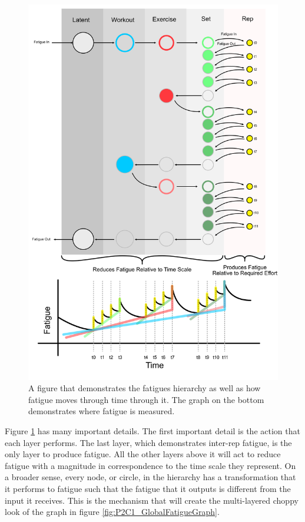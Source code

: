 \begin{figure}[htbp]
    \centering
    \includegraphics[scale=0.55]{images/p2/ch1/FatigueThroughTime.png}
    \caption{A figure that demonstrates the fatigues hierarchy as well as how fatigue moves through time through it. The graph on the bottom demonstrates where fatigue is measured.}
    \label{fig:P2C1_FatigueHierarchyTimeGraph}
\end{figure}

Figure \ref{fig:P2C1_FatigueHierarchyTimeGraph} has many important details. The first important detail is the action that each layer performs. The last layer, which demonstrates inter-rep fatigue, is the only layer to produce fatigue. All the other layers above it will act to reduce fatigue with a magnitude in correspondence to the time scale they represent. On a broader sense, every node, or circle, in the hierarchy has a transformation that it performs to fatigue such that the fatigue that it outputs is different from the input it receives. This is the mechanism that will create the multi-layered choppy look of the graph in figure \ref{fig:P2C1_GlobalFatigueGraph}. 

